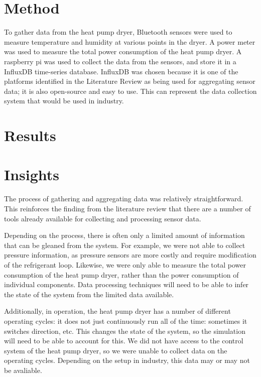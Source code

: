 \documentclass[12pt]{report}
\begin{document}
\section{Method}

To gather data from the heat pump dryer, Bluetooth sensors were used to measure temperature and humidity at various points in the dryer. A power meter was used to measure the total power consumption of the heat pump dryer. A raspberry pi was used to collect the data from the sensors, and store it in a InfluxDB time-series database. InfluxDB was chosen because it is one of the platforms identified in the Literature Review as being used for aggregating sensor data; it is also open-source and easy to use. This can represent the data collection system that would be used in industry.

\section{Results}


\section{Insights}

The process of gathering and aggregating data was relatively straightforward. This reinforces the finding from the literature review that there are a number of tools already available for collecting and processing sensor data. 

Depending on the process, there is often only a limited amount of information that can be gleaned from the system. For example, we were not able to collect pressure information, as pressure sensors are more costly and require modification of the refrigerant loop. Likewise, we were only able to measure the total power consumption of the heat pump dryer, rather than the power consumption of individual components. Data processing techniques will need to be able to infer the state of the system from the limited data available.

Additionally, in operation, the heat pump dryer has a number of different operating cycles: it does not just continuously run all of the time: sometimes it switches direction, etc. This changes the state of the system, so the simulation will need to be able to account for this. We did not have access to the control system of the heat pump dryer, so we were unable to collect data on the operating cycles. Depending on the setup in industry, this data may or may not be avaliable.
\end{document}
